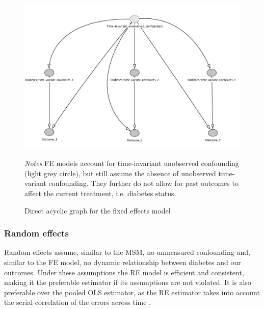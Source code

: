 \begin{figure}[!p]
\begin{center}
\caption{\label{fig:DAG_fe} Direct acyclic graph for the fixed effects model}
\DIFdelbeginFL %
\DIFdelendFL \DIFaddbeginFL \includegraphics[width=\linewidth]{Chapter5/DAG/dag_fe_alt_corrections}
\DIFaddendFL \end{center}
\DIFdelbeginFL %
\DIFdelendFL \DIFaddbeginFL \footnotesize{\textit{Notes} \ac{FE} models account for time-invariant unobserved confounding (light grey circle), but still assume the absence of unobserved time-variant confounding. They further do not allow for past outcomes to affect the current treatment, i.e. diabetes status.}
\DIFaddendFL \end{figure}


\subsubsection{Random effects}

Random effects assume, similar to the \ac{MSM}, no unmeasured confounding and, similar to the \ac{FE} model, no dynamic relationship between diabetes and our outcomes. Under these assumptions the \ac{RE} model is efficient and consistent, making it the preferable estimator if its assumptions are not violated. It is also preferable over the pooled \ac{OLS} estimator, as the \ac{RE} estimator takes into account the serial correlation of the errors across time \parencite{Wooldridge2012}. 

